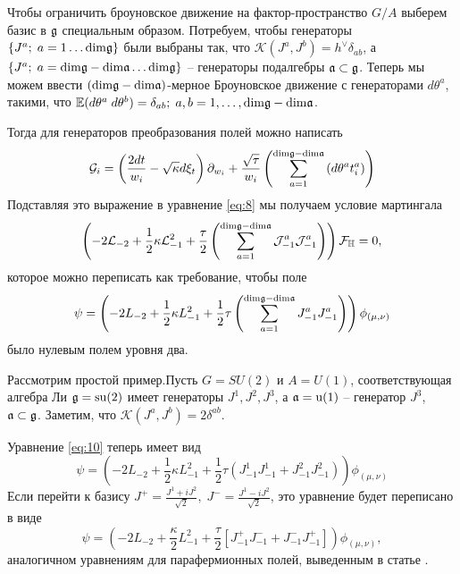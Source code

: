 Чтобы ограничить броуновское движение на фактор-пространство $G/A$ выберем базис в $\mathfrak{g}$ специальным образом. Потребуем, чтобы генераторы $\{J^{a};\; a=1\dots \mathrm{dim}\mathfrak{g}\}$ были выбраны так, что $\mathcal{K}(J^{a},J^{b})=h^{\vee}\delta_{ab}$, а $\{J^{a};\; a=\mathrm{dim}\mathfrak{g}-\mathrm{dim}\mathfrak{a}\dots \mathrm{dim}\mathfrak{g}\}$ -- генераторы подалгебры $\mathfrak{a}\subset \mathfrak{g}$. Теперь мы  можем ввести  $(\mathrm{dim}\mathfrak{g}-\mathrm{dim}\mathfrak{a})$-мерное Броуновское движение с генераторами $d\theta^{a}$, такими, что $\mathbb{E}(d\theta^{a} \; d\theta^{b})=\delta_{ab};\; a,b=1,\dots,\mathrm{dim}\mathfrak{g}-\mathrm{dim}\mathfrak{a}$.

Тогда для генераторов преобразования полей можно написать
\begin{equation}
  \mathcal{G}_{i}=\left(\frac{2dt}{w_{i}}-\sqrt{\kappa} d\xi_{t}\right) \partial_{w_{i}}+\frac{\sqrt{\tau}}{w_{i}}\left(\sum_{a=1}^{\mathrm{dim}\mathfrak{g}-\mathrm{dim}\mathfrak{a}}\left(d \theta ^{a} t^{a}_{i}\right)\right)
\label{eq:5}
\end{equation}
Подставляя это выражение в уравнение \eqref{eq:8} мы получаем условие мартингала
\begin{equation}
  \left(-2 \mathcal{L}_{-2}+\frac{1}{2}\kappa \mathcal{L}_{-1}^{2}+\frac{\tau}{2}\left( \sum_{a=1}^{\mathrm{dim}\mathfrak{g}-\mathrm{dim}\mathfrak{a}} \mathcal{J}^{a}_{-1} \mathcal{J}^{a}_{-1}\right)\right)        \mathcal{F}_{\mathbb{H}}=0,
\label{eq:9}
\end{equation}
которое можно переписать как требование, чтобы поле
\begin{equation}
  \psi=\left(-2L_{-2}+\frac{1}{2}\kappa L_{-1}^{2}+\frac{1}{2}\tau \left(\sum_{a=1}^{\mathrm{dim}\mathfrak{g}-\mathrm{dim}\mathfrak{a}}J^{a}_{-1}J^{a}_{-1}\right)\right) \phi_{(\mu,\nu)}
\label{eq:10}
\end{equation}
было нулевым полем уровня два.

Рассмотрим простой пример.Пусть $G=SU(2)$ и $A=U(1)$, соответствующая алгебра Ли $\mathfrak{g}=\mathrm{su}(2)$ имеет генераторы $J^{1},J^{2},J^{3}$, а $\mathfrak{a}=\mathrm{u}(1)$ -- генератор $J^{3}$, $\mathfrak{a}\subset\mathfrak{g}$. Заметим, что $\mathcal{K}(J^{a},J^{b})=2\delta^{ab}$. 

Уравнение \eqref{eq:10} теперь имеет вид
\begin{equation}
  \label{eq:11}
  \psi=\left(-2L_{-2}+\frac{1}{2}\kappa L_{-1}^{2}+\frac{1}{2}\tau \left(J^{1}_{-1}J^{1}_{-1}+J^{2}_{-1}J^{2}_{-1}\right)\right) \phi_{(\mu,\nu)}
\end{equation}
Если перейти к базису $J^{+}=\frac{J^{1}+iJ^{2}}{\sqrt{2}},\; J^{-}=\frac{J^{1}-iJ^{2}}{\sqrt{2}}$, это уравнение будет переписано в виде
\begin{equation}
 \psi= \left(-2 L_{-2}+\frac{\kappa}{2}L_{-1}^{2}+\frac{\tau}{2}\left[J^{+}_{-1}J^{-}_{-1}+J^{-}_{-1}J^{+}_{-1}\right]\right) \phi_{(\mu,\nu)},
\label{eq:12}
\end{equation}
аналогичном уравнениям для парафермионных полей, выведенным в статье  \cite{santachiara2008sle}.

